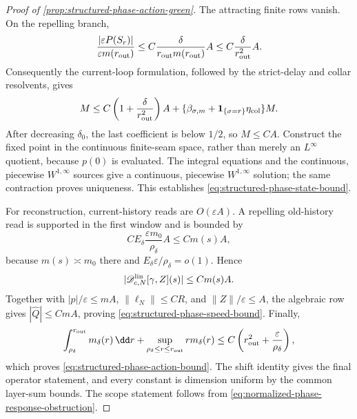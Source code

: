 \begin{proof}[Proof of
\cref{prop:structured-phase-action-green}]
The attracting finite rows vanish.  On the repelling branch,
\[
 \frac{|\varepsilon P(S_r)|}{\varepsilon m(r_{\rm out})}
 \le C\frac{\delta}{r_{\rm out}m(r_{\rm out})}A
 \le C\frac{\delta}{r_{\rm out}^2}A.
\]
Consequently the current-loop formulation, followed by the strict-delay
and collar resolvents, gives
\[
 M\le C\left(1+\frac{\delta}{r_{\rm out}^2}\right)A
       +\{\beta_{\sigma,m}
          +\mathbf1_{\{\sigma=r\}}\eta_{\rm col}\}M.
\]
After decreasing \(\delta_0\), the last coefficient is below \(1/2\), so
\(M\le CA\).  Construct the fixed point in the continuous finite-seam
space, rather than merely an \(L^\infty\) quotient, because \(p(0)\) is
evaluated.  The integral equations and the continuous, piecewise
\(W^{1,\infty}\) sources give a continuous, piecewise \(W^{1,\infty}\)
solution; the same contraction proves uniqueness.  This establishes
\cref{eq:structured-phase-state-bound}.

For reconstruction, current-history reads are \(O(\varepsilon A)\).  A
repelling old-history read is supported in the first window and is bounded
by
\[
 CE_\delta\frac{\varepsilon m_0}{\rho_\delta}A
 \le Cm(s)A,
\]
because \(m(s)\asymp m_0\) there and
\(E_\delta\varepsilon/\rho_\delta=o(1)\).  Hence
\[
 |\mathscr D_{c,N}^{\rm lin}[\gamma,Z](s)|\le Cm(s)A.
\]
Together with \(|p|/\varepsilon\le mA\),
\(\|\ell_N\|\le CR\), and \(\|Z\|/\varepsilon\le A\), the algebraic row
gives \(|\widehat Q|\le CmA\), proving
\cref{eq:structured-phase-speed-bound}.  Finally,
\[
 \int_{\rho_\delta}^{r_{\rm out}}m_\delta(r)\,\dd r
 +\sup_{\rho_\delta\le r\le r_{\rm out}}r m_\delta(r)
 \le C\left(r_{\rm out}^2+\frac{\varepsilon}{\rho_\delta}\right),
\]
which proves \cref{eq:structured-phase-action-bound}.  The shift identity
gives the final operator statement, and every constant is dimension
uniform by the common layer-sum bounds.  The scope statement follows from
\cref{eq:normalized-phase-response-obstruction}.
\end{proof}

